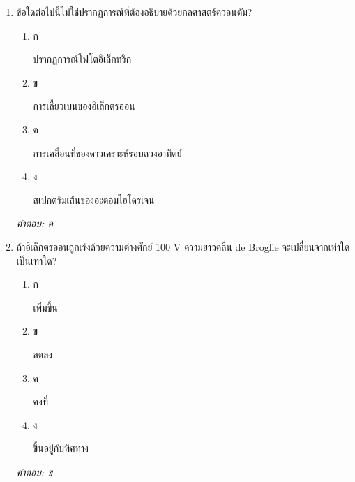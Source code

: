 \documentclass[12pt]{article}
\begin{document}
\begin{enumerate}[label=\arabic*., itemsep=0.5\baselineskip, topsep=0.5\baselineskip, leftmargin=*]
\item ข้อใดต่อไปนี้ไม่ใช่ปรากฏการณ์ที่ต้องอธิบายด้วยกลศาสตร์ควอนตัม?
\begin{enumerate}[label=\alph*)., itemsep=0.3\baselineskip, topsep=0.3\baselineskip]
\item ก\ 
\begin{minipage}[t]{0.9\linewidth}
\raggedright ปรากฏการณ์โฟโตอิเล็กทริก
\end{minipage}
\item ข\ 
\begin{minipage}[t]{0.9\linewidth}
\raggedright การเลี้ยวเบนของอิเล็กตรออน
\end{minipage}
\item ค\ 
\begin{minipage}[t]{0.9\linewidth}
\raggedright การเคลื่อนที่ของดาวเคราะห์รอบดวงอาทิตย์
\end{minipage}
\item ง\ 
\begin{minipage}[t]{0.9\linewidth}
\raggedright สเปกตรัมเส้นของอะตอมไฮโดรเจน
\end{minipage}
\end{enumerate}
\vspace{-0.3\baselineskip}
\begin{small}
\textit{คำตอบ: ค}
\end{small}

\item ถ้าอิเล็กตรออนถูกเร่งด้วยความต่างศักย์ 100 V ความยาวคลื่น de Broglie จะเปลี่ยนจากเท่าใดเป็นเท่าใด?
\begin{enumerate}[label=\alph*)., itemsep=0.3\baselineskip, topsep=0.3\baselineskip]
\item ก\ 
\begin{minipage}[t]{0.9\linewidth}
\raggedright เพิ่มขึ้น
\end{minipage}
\item ข\ 
\begin{minipage}[t]{0.9\linewidth}
\raggedright ลดลง
\end{minipage}
\item ค\ 
\begin{minipage}[t]{0.9\linewidth}
\raggedright คงที่
\end{minipage}
\item ง\ 
\begin{minipage}[t]{0.9\linewidth}
\raggedright ขึ้นอยู่กับทิศทาง
\end{minipage}
\end{enumerate}
\vspace{-0.3\baselineskip}
\begin{small}
\textit{คำตอบ: ข}
\end{small}


\end{enumerate}
\end{document}
